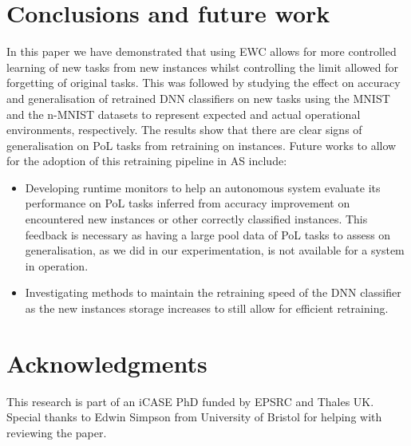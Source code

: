 \section{Conclusions and future work}\label{sec:conclusions}
In this paper we have demonstrated that using EWC allows for more controlled learning of new tasks from new instances whilst controlling the limit allowed for forgetting of original tasks.
%
This was followed by studying the effect on accuracy and generalisation of retrained DNN classifiers on new tasks using the MNIST and the n-MNIST datasets to represent expected and actual operational environments, respectively. 
%
%
The results show that there are clear signs of generalisation on PoL tasks from retraining on instances. %
%
Future works to allow for the adoption of this retraining pipeline in AS include:
\begin{itemize}
    \item Developing runtime monitors to help an autonomous system evaluate its performance on PoL tasks 
    inferred from accuracy improvement on encountered new instances or other correctly classified instances. This feedback is necessary as having a large pool data of PoL tasks to assess on generalisation, as we did in our experimentation, is not available for a system in operation.
%
   \item Investigating methods to maintain the retraining speed of the DNN classifier as the new instances storage increases to still allow for efficient retraining.
   
\end{itemize}

\section*{Acknowledgments}
This research is part of an iCASE PhD funded by EPSRC and Thales UK. Special thanks to 
Edwin Simpson from University of Bristol for helping with reviewing the paper.
